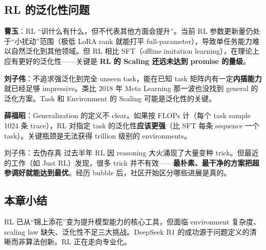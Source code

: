 \subsection{RL 的泛化性问题}

\textbf{曹玉}：RL ``训什么有什么，但不代表其他方面会提升''。当前 RL 参数更新量仍处于``小扰动''范围（极低 LoRA rank 就能打平 full-parameter），导致单任务能力难以自然泛化到其他领域。但 RL 相比 SFT（offline imitation learning），在理论上应有更好的泛化性——关键是 \textbf{RL 的 Scaling 还远未达到 promise 的量级}。

\textbf{刘子伟}：不追求强泛化到完全 unseen task，能在已知 task 矩阵内有一定\textbf{内插能力}就已经足够 impressive。类比 2018 年 Meta Learning 那一波也没找到 general 的泛化方案。Task 和 Environment 的 Scaling 可能是泛化性的关键。

\textbf{薛福昭}：Generalization 的定义不 clear。如果按 FLOPs 计（每个 task sample 1024 条 trace），RL 对指定 task 的泛化性\textbf{应该更强}（比 SFT 每条 sequence 一个 task）。关键瓶颈是无法获得 trillion 级别的 environments。

\begin{knowledgebox}{刘子伟：去伪存真}
过去半年 RL 因 reasoning 大火涌现了大量变种 trick。但最近的工作（如 Just RL）发现，很多 trick 并不有效——\textbf{最朴素、最干净的方案把超参调好就能达到最优}。经历 bubble 后，社区开始区分哪些进展是真的。
\end{knowledgebox}

\subsection{本章小结}
RL 已从``锦上添花''变为提升模型能力的核心工具，但面临 environment 复杂度、scaling law 缺失、泛化性不足三大挑战。DeepSeek R1 的成功源于问题定义的清晰而非算法创新。RL 正在走向专业化。

